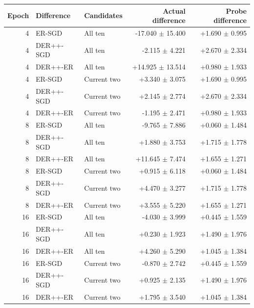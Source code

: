 \begin{tabular}{rllrr}
\toprule
Epoch & Difference & Candidates & Actual difference & Probe difference \\
\midrule
4 & ER-SGD & All ten & -17.040 $\pm$ 15.400 & +1.690 $\pm$ 0.995 \\
4 & DER++-SGD & All ten & -2.115 $\pm$ 4.221 & +2.670 $\pm$ 2.334 \\
4 & DER++-ER & All ten & +14.925 $\pm$ 13.514 & +0.980 $\pm$ 1.933 \\
4 & ER-SGD & Current two & +3.340 $\pm$ 3.075 & +1.690 $\pm$ 0.995 \\
4 & DER++-SGD & Current two & +2.145 $\pm$ 2.774 & +2.670 $\pm$ 2.334 \\
4 & DER++-ER & Current two & -1.195 $\pm$ 2.471 & +0.980 $\pm$ 1.933 \\
8 & ER-SGD & All ten & -9.765 $\pm$ 7.886 & +0.060 $\pm$ 1.484 \\
8 & DER++-SGD & All ten & +1.880 $\pm$ 3.753 & +1.715 $\pm$ 1.778 \\
8 & DER++-ER & All ten & +11.645 $\pm$ 7.474 & +1.655 $\pm$ 1.271 \\
8 & ER-SGD & Current two & +0.915 $\pm$ 6.118 & +0.060 $\pm$ 1.484 \\
8 & DER++-SGD & Current two & +4.470 $\pm$ 3.277 & +1.715 $\pm$ 1.778 \\
8 & DER++-ER & Current two & +3.555 $\pm$ 5.220 & +1.655 $\pm$ 1.271 \\
16 & ER-SGD & All ten & -4.030 $\pm$ 3.999 & +0.445 $\pm$ 1.559 \\
16 & DER++-SGD & All ten & +0.230 $\pm$ 1.923 & +1.490 $\pm$ 1.976 \\
16 & DER++-ER & All ten & +4.260 $\pm$ 5.290 & +1.045 $\pm$ 1.384 \\
16 & ER-SGD & Current two & -0.870 $\pm$ 2.742 & +0.445 $\pm$ 1.559 \\
16 & DER++-SGD & Current two & +0.925 $\pm$ 2.135 & +1.490 $\pm$ 1.976 \\
16 & DER++-ER & Current two & +1.795 $\pm$ 3.540 & +1.045 $\pm$ 1.384 \\
\bottomrule
\end{tabular}
